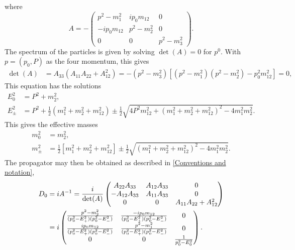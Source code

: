 where
\begin{equation*}
    A = -
    \begin{pmatrix}
        p^2 - m^2_1             & i p_0 m_{12}     & 0             \\
        - i p_0 m_{12}            & p^2 - m^2_2       & 0             \\
        0                       & 0                 & p^2 - m^2_3
    \end{pmatrix}.
\end{equation*}
The spectrum of the particles is given by solving $\det(A) = 0$ for $p^0$. With $p = (p_0, P)$ as the four momentum, this gives
\begin{align*}
    \det(A) & = A_{33} \left(A_{11} A_{22} + A_{12}^2\right)
    = - \left(p^2 - m^2_3\right)
    \left[
        \left(p^2 - m^2_1\right)
        \left(p^2 - m^2_2\right)
        - p_0^2 m_{12}^2
    \right] = 0,
\end{align*}
This equation has the solutions
\begin{align}
    E_0^2 &= P^2 + m_2^2, \\
    E_\pm^2
    & = P^2 +
    \frac{1}{2}
    \left(
        m_1^2 + m_2^2 + m_{12}^2 
    \right)
    \pm 
    \frac{1}{2}
    \sqrt{
        4P^2m_{12}^2 
        +
        \left(
            m_1^2 + m_2^2 + m_{12}^2
        \right)^2
        - 4 m_1^2 m_2^2
    }.
\end{align}
This gives the effective masses
\begin{align}
    m_0^2 &= m_2^2, \\
    m_\pm^2
    & =  \frac{1}{2}
    \left[
        m_1^2 + m_2^2 + m_{12}^2 
    \right]
    \pm \frac{1}{2}
    \sqrt{
        \left(
            m_1^2 + m_2^2 + m_{12}^2
        \right)^2
        - 4 m_1^2 m_2^2
    }.
\end{align}
The propagator may then be obtained as described in \autoref{Conventions and notation},
\begin{align}
    \notag
    D_0 & = i A^{-1} = \frac{i}{\det(A)}
    \begin{pmatrix}
        A_{22} A_{33}   & A_{12}A_{33}  & 0 \\
        -A_{12}A_{33}   & A_{11}A_{33}  & 0 \\
        0               & 0             & A_{11}A_{22} + A_{12}^2
    \end{pmatrix} \\
    \label{free pion propagator}
    & = i
    \begin{pmatrix}
        \frac{
            p^2 - m_2^2
        }
        {
            (p_0^2 - E_+^2)(p_0^2 - E_-^2)
        } 
        & \frac{
            - ip_0m_{12}
        }
        {
            (p_0^2 - E_+^2)(p_0^2 - E_-^2)
        } & 0 \\
        \frac{
            ip_0m_{12}
        }
        {
            (p_0^2 - E_+^2)(p_0^2 - E_-^2)
        }
        & \frac{
            p^2 - m_1^2
        }
        {
            (p_0^2 - E_+^2)(p_0^2 - E_-^2)
        } & 0 \\
        0 & 0 & 
        \frac{1}{p_0^2 - E_0^2}
    \end{pmatrix}.
\end{align}

